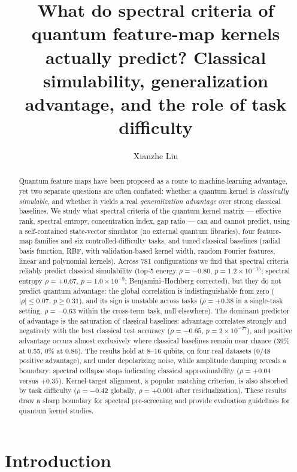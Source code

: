 \documentclass[a4paper,unpublished,onecolumn,nopdfoutputerror,12pt]{quantumarticle}
\title{What do spectral criteria of quantum feature-map kernels actually predict?
Classical simulability, generalization advantage, and the role of task difficulty}
\author{Xianzhe Liu}
\affiliation{School of Physics and Electronics, Hunan University, Changsha 410082, China}
\begin{document}
\maketitle

\begin{abstract}
Quantum feature maps have been proposed as a route to machine-learning advantage, yet
two separate questions are often conflated: whether a quantum kernel is \emph{classically
simulable}, and whether it yields a real \emph{generalization advantage} over strong
classical baselines. We study what spectral criteria of the quantum kernel matrix ---
effective rank, spectral entropy, concentration index, gap ratio --- can and cannot
predict, using a self-contained state-vector simulator (no external quantum libraries),
four feature-map families and six controlled-difficulty tasks, and
tuned classical baselines (radial basis function, RBF, with validation-based kernel
width, random Fourier features, linear and polynomial kernels). Across 781 configurations we find that
spectral criteria reliably predict classical simulability (top-5 energy $\rho=-0.80$,
$p=1.2\times10^{-15}$; spectral entropy $\rho=+0.67$, $p=1.0\times10^{-9}$;
Benjamini--Hochberg corrected), but they do not predict quantum advantage: the global
correlation is indistinguishable from zero ($|\rho|\le0.07$, $p\ge0.31$), and its sign
is unstable across tasks ($\rho=+0.38$ in a single-task setting, $\rho=-0.63$ within
the cross-term task, null elsewhere). The dominant predictor of advantage is the
saturation of classical baselines: advantage correlates strongly and negatively with the
best classical test accuracy ($\rho=-0.65$, $p=2\times10^{-27}$), and positive advantage
occurs almost exclusively where classical baselines remain near chance (39\% at 0.55,
0\% at 0.86). The results hold at $8$--$16$ qubits, on four real datasets ($0/48$
positive advantage), and under depolarizing noise, while amplitude damping reveals a
boundary: spectral collapse stops indicating classical approximability ($\rho=+0.04$
versus $+0.35$). Kernel-target alignment, a popular matching criterion, is also
absorbed by task difficulty ($\rho=-0.42$ globally, $\rho=+0.001$ after
residualization). These results draw a sharp boundary for spectral pre-screening and
provide evaluation guidelines for quantum kernel studies.
\end{abstract}

\section{Introduction}
\label{sec:intro}
\end{document}
